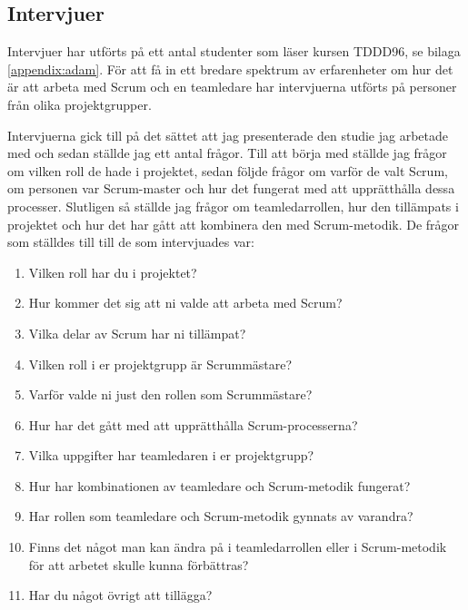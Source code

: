 \subsection{Intervjuer}
Intervjuer har utförts på ett antal studenter som läser kursen TDDD96, se bilaga \ref{appendix:adam}. För att få in ett bredare spektrum av erfarenheter om hur det är att arbeta med Scrum och en teamledare har intervjuerna utförts på personer från olika projektgrupper.

Intervjuerna gick till på det sättet att jag presenterade den studie jag arbetade med och sedan ställde jag ett antal frågor. Till att börja med ställde jag frågor om vilken roll de hade i projektet, sedan följde frågor om varför de valt Scrum, om personen var Scrum-master och hur det fungerat med att upprätthålla dessa processer. Slutligen så ställde jag frågor om teamledarrollen, hur den tillämpats i projektet och hur det har gått att kombinera den med Scrum-metodik. De frågor som ställdes till till de som intervjuades var:

\begin{enumerate}

\item Vilken roll har du i projektet?

\item Hur kommer det sig att ni valde att arbeta med Scrum?

\item Vilka delar av Scrum har ni tillämpat?

\item Vilken roll i er projektgrupp är Scrummästare?

\item Varför valde ni just den rollen som Scrummästare?

\item Hur har det gått med att upprätthålla Scrum-processerna?

\item Vilka uppgifter har teamledaren i er projektgrupp?

\item Hur har kombinationen av teamledare och Scrum-metodik fungerat?

\item Har rollen som teamledare och Scrum-metodik gynnats av varandra?

\item Finns det något man kan ändra på i teamledarrollen eller i Scrum-metodik för att arbetet skulle kunna förbättras?

\item Har du något övrigt att tillägga?

\end{enumerate}

